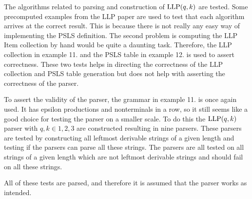 The algorithms related to parsing and construction of $\text{LLP}(q, k)$ are tested. Some precomputed examples from the LLP paper \cite{Vagner2007} are used to test that each algorithm arrives at the correct result. This is because there is not really any easy way of implementing the PSLS definition. The second problem is computing the LLP Item collection by hand would be quite a daunting task. Therefore, the LLP collection in example 11. \cite[14]{Vagner2007} and the PSLS table in example 12. \cite[14]{Vagner2007} is used to assert correctness. These two tests helps in directing the correctness of the LLP collection and PSLS table generation but does not help with asserting the correctness of the parser.

To assert the validity of the parser, the grammar in example 11. \cite[14]{Vagner2007} is once again used. It has epsilon productions and nonterminals in a row, so it still seems like a good choice for testing the parser on a smaller scale. To do this the $\text{LLP}(q, k)$ parser with $q, k \in {1, 2, 3}$ are constructed resulting in nine parsers. These parsers are tested by constructing all leftmost derivable strings of a given length and testing if the parsers can parse all these strings. The parsers are all tested on all strings of a given length which are not leftmost derivable strings and should fail on all these strings.

All of these tests are parsed, and therefore it is assumed that the parser works as intended.